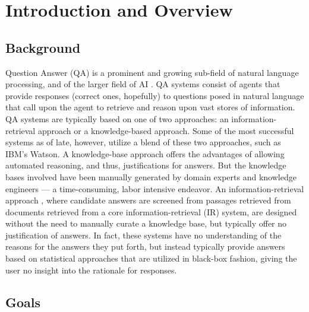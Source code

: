  
\chapter{Introduction and Overview}

\section{Background}
Question Answer (QA) \cite{radev2000ranking} is a prominent and growing sub-field of natural language processing, and of the larger
field of AI \cite{Russell:2003:AIM:773294}.  QA systems \cite{radev2000ranking} consist of agents that provide responses (correct ones, hopefully) to questions posed in natural language that call upon the agent to retrieve and reason upon vast stores of information.  QA systems are typically based on one of two approaches: an
information-retrieval \cite{manning2008introduction} approach or a knowledge-based \cite{brachman2004knowledge} approach.  Some of the most successful systems
as of late, however, utilize a blend of these two approaches, such as IBM's Watson.  A knowledge-base \cite{brachman2004knowledge} 
approach offers the advantages of allowing automated reasoning, and thus, justifications for answers.
But the knowledge bases involved have been manually generated by domain experts and knowledge
engineers --- a time-consuming, labor intensive endeavor.  An information-retrieval approach \cite{manning2008introduction}, where
candidate answers are screened from passages retrieved from documents retrieved from a core
information-retrieval (IR) system, are designed without the need to manually curate a knowledge
base, but typically offer no justification of answers.  In fact, these systems have no understanding
of the reasons for the answers they put forth, but instead typically provide answers based on statistical approaches that are utilized in black-box fashion, giving the user no insight into the rationale for 
responses.



\section{Goals}

